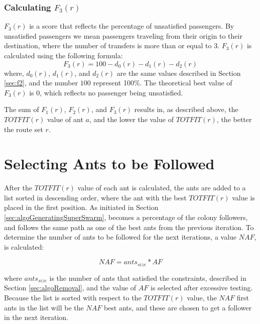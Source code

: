 \subsubsection{Calculating $F_{3}(r)$}
\label{sec:f3}
$F_3(r)$ is a score that reflects the percentage of unsatisfied passengers. By unsatisfied passengers we mean passengers traveling from their origin to their destination, where the number of transfers is more than or equal to 3. $F_3(r)$ is calculated using the following formula:
\newline
$$F_3(r) = 100 - d_0(r) - d_1(r) - d_2(r)$$
\newline
where, $d_0(r)$, $d_1(r)$, and $d_2(r)$ are the same values described in Section \vref{sec:f2}, and the number $100$ represent 100\%. The theoretical best value of $F_3(r)$ is 0, which reflects no passenger being unsatisfied. 

The sum of $F_{1}(r)$, $F_{2}(r)$, and $F_{3}(r)$ results in, as described above, the $TOTFIT(r)$ value of ant $a$, and the lower the value of $TOTFIT(r)$, the better the route set $r$. 

\section{Selecting Ants to be Followed}
\label{sec:selctingAntsToBeFollowed}

After the $TOTFIT(r)$ value of each ant is calculated, the ants are added to a list sorted in descending order, where the ant with the best $TOTFIT(r)$ value is placed in the first position. As initiated in Section \vref{sec:algoGeneratingSuperSwarm}, becomes a percentage of the colony followers, and follows the same path as one of the best ants from the previous iteration. To determine the number of ants to be followed for the next iterations, a value $NAF$, is calculated:

$$NAF = ants_{size} * AF$$
 
where $ants_{size}$ is the number of ants that satisfied the constraints, described in Section \vref{sec:algoRemoval}, and the value of $AF$ is selected after excessive testing. Because the list is sorted with respect to the $TOTFIT(r)$ value, the $NAF$ first ants in the list will be the $NAF$ best ants, and these are chosen to get a follower in the next iteration. %

